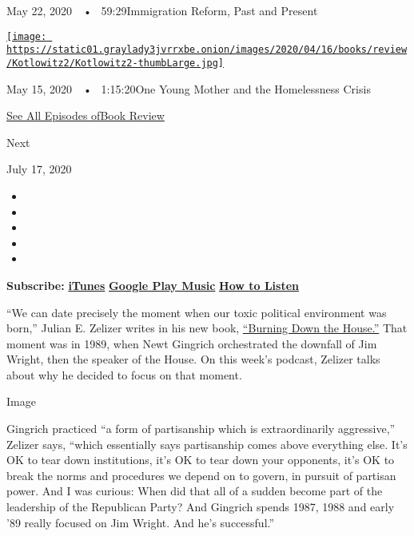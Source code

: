 May 22, 2020~~•~ 59:29Immigration Reform, Past and Present

\href{https://www.nytimes3xbfgragh.onion/2020/05/15/books/review/podcast-lauren-sandler-this-is-all-i-got-sarah-weinman-crime-fiction.html?action=click\&module=audio-series-bar\&region=header\&pgtype=Article}{\texttt{[image: https://static01.graylady3jvrrxbe.onion/images/2020/04/16/books/review/Kotlowitz2/Kotlowitz2-thumbLarge.jpg]}}

May 15, 2020~~•~ 1:15:20One Young Mother and the Homelessness Crisis

\href{https://www.nytimes3xbfgragh.onion/column/book-review-podcast}{See
All Episodes ofBook Review}

Next

July 17, 2020

\begin{itemize}
\item
\item
\item
\item
\item
\end{itemize}

\textbf{Subscribe:}
\textbf{\href{https://itunes.apple.com/us/podcast/book-review/id120315179?mt=2}{iTunes}}
\textbf{\textbar{}}
\textbf{\href{https://play.google.com/music/listen?u=0\#/ps/Iv6zeb5qwjtzjfbyo3vy5zny5ky}{Google
Play Music}} \textbf{\textbar{}}
\textbf{\href{https://www.nytimes3xbfgragh.onion/2018/08/03/books/review/how-to-listen-to-the-book-review-podcast.html}{How
to Listen}}

``We can date precisely the moment when our toxic political environment
was born,'' Julian E. Zelizer writes in his new book,
\href{https://www.nytimes3xbfgragh.onion/2020/07/07/books/review/burning-down-the-house-julian-zelizer.html}{``Burning
Down the House.''} That moment was in 1989, when Newt Gingrich
orchestrated the downfall of Jim Wright, then the speaker of the House.
On this week's podcast, Zelizer talks about why he decided to focus on
that moment.

Image

Gingrich practiced ``a form of partisanship which is extraordinarily
aggressive,'' Zelizer says, ``which essentially says partisanship comes
above everything else. It's OK to tear down institutions, it's OK to
tear down your opponents, it's OK to break the norms and procedures we
depend on to govern, in pursuit of partisan power. And I was curious:
When did that all of a sudden become part of the leadership of the
Republican Party? And Gingrich spends 1987, 1988 and early '89 really
focused on Jim Wright. And he's successful.''

